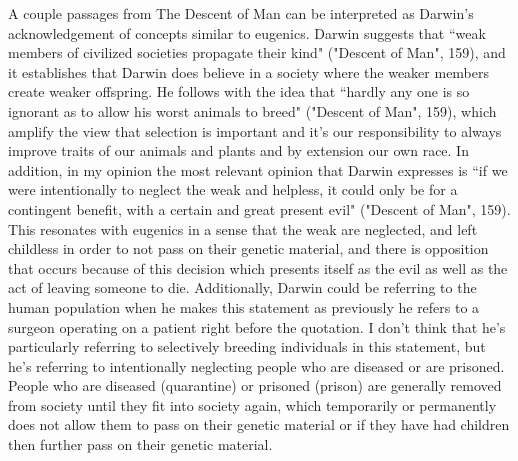 \documentclass[11pt, oneside]{article}
\begin{document}
\par A couple passages from The Descent of Man can be interpreted as Darwin's acknowledgement of concepts similar to eugenics. Darwin suggests that ``weak members of civilized societies propagate their kind" ("Descent of Man", 159), and it establishes that Darwin does believe in a society where the weaker members create weaker offspring. He follows with the idea that ``hardly any one is so ignorant as to allow his worst animals to breed" ("Descent of Man", 159), which amplify the view that selection is important and it's our responsibility to always improve traits of our animals and plants and by extension our own race. In addition, in my opinion the most relevant opinion that Darwin expresses is  ``if we were intentionally to neglect the weak and helpless, it could only be for a contingent benefit, with a certain and great present evil" ("Descent of Man", 159). This resonates with eugenics in a sense that the weak are neglected, and left childless in order to not pass on their genetic material, and there is opposition that occurs because of this decision which presents itself as the evil as well as the act of leaving someone to die. Additionally, Darwin could be referring to the human population when he makes this statement as previously he refers to a surgeon operating on a patient right before the quotation. I don't think that he's particularly referring to selectively breeding individuals in this statement, but he's referring to intentionally neglecting people who are diseased or are prisoned. People who are diseased (quarantine) or prisoned (prison) are generally removed from society until they fit into society again, which temporarily or permanently does not allow them to pass on their genetic material or if they have had children then further pass on their genetic material. 

\end{document}
